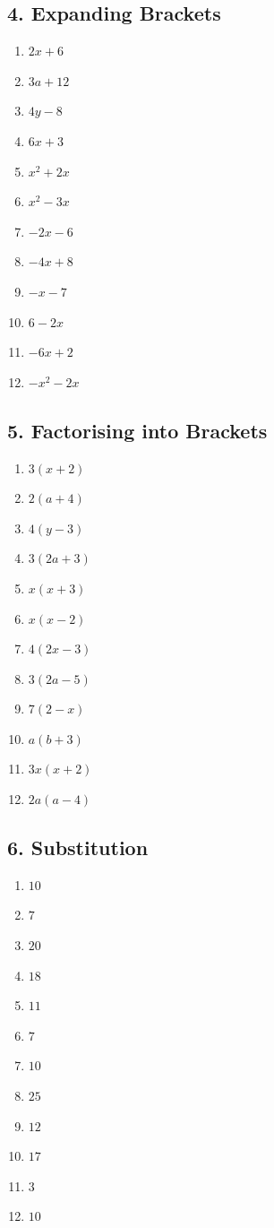 \documentclass[12pt,a4paper]{article}
\begin{document}
\subsection*{4. Expanding Brackets}
\begin{multicols}{4}\begin{enumerate}[nosep, label=\arabic*., start=1]
\item $2x + 6$
\item $3a + 12$
\item $4y - 8$
\item $6x + 3$
\item $x^{2} + 2x$
\item $x^{2} - 3x$
\item $-2x - 6$
\item $-4x + 8$
\item $-x - 7$
\item $6 - 2x$
\item $-6x + 2$
\item $-x^{2} - 2x$
\end{enumerate}\end{multicols}

\subsection*{5. Factorising into Brackets}
\begin{multicols}{4}\begin{enumerate}[nosep, label=\arabic*., start=1]
\item $3(x + 2)$
\item $2(a + 4)$
\item $4(y - 3)$
\item $3(2a + 3)$
\item $x(x + 3)$
\item $x(x - 2)$
\item $4(2x - 3)$
\item $3(2a - 5)$
\item $7(2 - x)$
\item $a(b + 3)$
\item $3x(x + 2)$
\item $2a(a - 4)$
\end{enumerate}\end{multicols}

\subsection*{6. Substitution}
\begin{multicols}{4}\begin{enumerate}[nosep, label=\arabic*., start=1]
\item $10$
\item $7$
\item $20$
\item $18$
\item $11$
\item $7$
\item $10$
\item $25$
\item $12$
\item $17$
\item $3$
\item $10$
\end{enumerate}\end{multicols}
\end{document}

